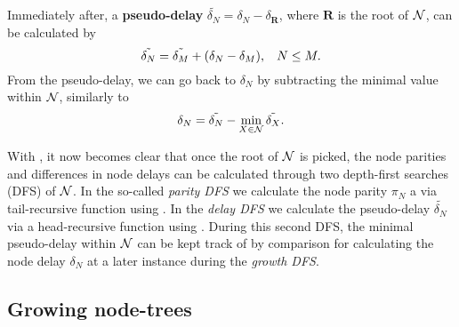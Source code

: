 Immediately after, a \textbf{pseudo-delay} $\tilde{\delta_N} = \delta_N - \delta_\mathbf{R}$, where $\mathbf{R}$ is the root of $\mathcal{N}$, can be calculated by
\begin{equation}\label{eq:pseudodelay}
    \tilde{\delta_N} = \tilde{\delta_M} + (\delta_N - \delta_M), \hspace{.3cm} N\leq M.
\end{equation}
From the pseudo-delay, we can go back to $\delta_N$ by subtracting the minimal value within $\mathcal{N}$, similarly to 
\begin{equation}\label{eq:delaypseudo}
    \delta_N = \tilde{\delta_N} - \min_{X \in \mathcal{N}}{\tilde{\delta_X}}. 
\end{equation}


With , it now becomes clear that once the root of $\mathcal{N}$ is picked, the node parities and differences in node delays can be calculated through two depth-first searches (DFS) of $\mathcal{N}$. In the so-called \emph{parity DFS} we calculate the node parity $\pi_N$ a via tail-recursive function using . In the \emph{delay DFS} we calculate the pseudo-delay $\tilde{\delta_N}$ via a head-recursive function using . During this second DFS, the minimal pseudo-delay within $\mathcal{N}$ can be kept track of by comparison for calculating the node delay $\delta_N$ at a later instance during the \emph{growth DFS}. 

\subsection{Growing node-trees}\label{sec:grownodetrees}

